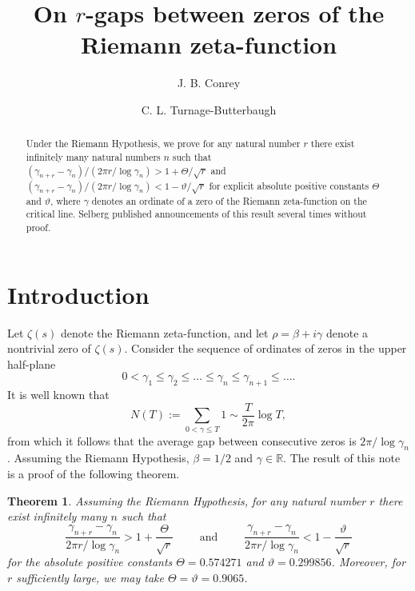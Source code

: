 \documentclass[oneside]{amsart}
\title[On $r$-gaps between zeros of $\zeta(s)$]%
 {On $r$-gaps between zeros of the Riemann zeta-function} %
\author[Conrey]{J. B. Conrey}
\author[Turnage-Butterbaugh]{C. L. Turnage-Butterbaugh}
\newtheorem*{theorem*}{Theorem}
\begin{document}
\maketitle

\begin{abstract}
Under the Riemann Hypothesis, we prove for any natural number $r$ there exist infinitely many natural numbers $n$ such that $(\gamma_{n+r}-\gamma_n)/(2\pi r /\log \gamma_n) > 1 + \Theta/\sqrt{r}$
and $(\gamma_{n+r}-\gamma_n)/(2\pi r /\log \gamma_n) < 1 - \vartheta/\sqrt{r}$ for explicit absolute positive constants $\Theta$ and $\vartheta$, where $\gamma$ denotes an ordinate of a zero of the Riemann zeta-function on the critical line. Selberg published announcements of this result several times without proof. 
\end{abstract}

\section{Introduction}
Let $\zeta(s)$ denote the Riemann zeta-function, and let $\rho = \beta + i\gamma$ denote a nontrivial zero of $\zeta(s)$. Consider the sequence of ordinates of zeros in the upper half-plane
\[
0 < \gamma_1 \le \gamma_2 \le \ldots \le \gamma_n \le \gamma_{n+1} \le \ldots.
\]
It is well known that 
\[
N(T) := \sum_{0<\gamma\le T}1 \sim \frac{T}{2\pi}\log T, 
\]
from which it follows that the average gap between consecutive zeros is $2\pi/\log \gamma_n$.  Assuming the Riemann Hypothesis, $\beta = 1/2$ and $\gamma \in \mathbb{R}$. The result of this note is a proof of the following theorem.

\begin{theorem*}\label{Selberg}
Assuming the Riemann Hypothesis, for any natural number $r$ there exist infinitely many $n$ such that 
\[
\frac{\gamma_{n+r}-\gamma_n}{2\pi r /\log \gamma_n} > 1 + \frac{\Theta}{\sqrt{r}} \qquad \text{ and } \qquad
\frac{\gamma_{n+r}-\gamma_n}{2\pi r /\log \gamma_n} < 1 - \frac{\vartheta}{\sqrt{r}}
\]
for the absolute positive constants $\Theta=0.574271$ and $\vartheta= 0.299856$. Moreover, for $r$ sufficiently large, we may take $\Theta= \vartheta = 0.9065$.
\end{theorem*}
\end{document}

